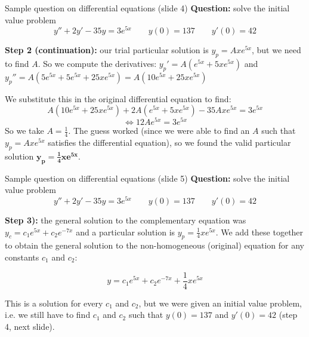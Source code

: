 \begin{frame}{Sample question on differential equations (slide 4)}
    \textbf{Question:} solve the initial value problem \[y''+2y'-35y=3e^{5x}\qquad y(0)=137\qquad y'(0)=42\]
    
    \textbf{Step 2 (continuation):} our trial particular solution is $y_p=Axe^{5x}$, but we need to find $A$. So we compute the derivatives: $y_p'=A(e^{5x}+5xe^{5x})$ and $y_p''=A(5e^{5x}+5e^{5x}+25xe^{5x})=A(10e^{5x}+25xe^{5x})$\pause

    We substitute this in the original differential equation to find: \[A(10e^{5x}+25xe^{5x})+2A(e^{5x}+5xe^{5x})-35Axe^{5x}=3e^{5x}\] \vspace{-7mm}\[\iff 12Ae^{5x}=3e^{5x}\]\pause
    So we take $A=\frac{1}{4}$. The guess worked (since we were able to find an $A$ such that $y_p=Axe^{5x}$ satisfies the differential equation), so we found the valid particular solution $\pmb{y_p=\frac{1}{4}xe^{5x}}$.

    

\end{frame}




\begin{frame}{Sample question on differential equations (slide 5)}
    \textbf{Question:} solve the initial value problem \[y''+2y'-35y=3e^{5x}\qquad y(0)=137\qquad y'(0)=42\]
    
    \textbf{Step 3):} the general solution to the complementary equation was $y_c = c_1e^{5x} + c_2e^{-7x}$ and a particular solution is $y_p=\frac{1}{4}xe^{5x}$. We add these together to obtain the general solution to the non-homogeneous (original) equation for any constants $c_1$ and $c_2$:\pause

    \[y=c_1e^{5x} + c_2e^{-7x} +\frac{1}{4}xe^{5x}\]\pause

    This is a solution for every $c_1$ and $c_2$, but we were given an initial value problem, i.e. we still have to find $c_1$ and $c_2$ such that $y(0)=137$ and $y'(0)=42$ (step 4, next slide).
    

\end{frame}


